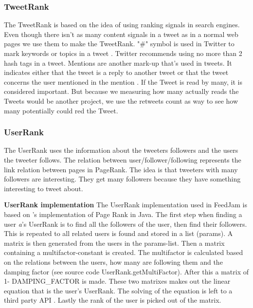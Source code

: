 \subsubsection{TweetRank}
The TweetRank is based on the idea of using ranking signals in search engines. Even though there isn't as many content signals in a tweet as in a normal web pages we use them to make the TweetRank. "\#" symbol is used in Twitter to mark keywords or topics in a tweet \citep{Twitter}. Twitter recommends using no more than 2 hash tags in a tweet. 
Mentions are another mark-up that's used in tweets. It indicates either that the tweet is a reply to another tweet or that the tweet concerns the user mentioned in the mention \citep{Twitterb}.
If the Tweet is read by many, it is considered important. But because we measuring how many actually reads the Tweets would be another project, we use the retweets count as way to see how many potentially could red the Tweet.

\subsubsection{UserRank}
The UserRank uses the information about the tweeters followers and the users the tweeter follows. The relation between user/follower/following represents the link relation between pages in PageRank. The idea is that tweeters with many followers are interesting. They get many followers because they have something interesting to tweet about. 

{\bf UserRank implementation}\newline
The UserRank implementation used in FeedJam is based on \citet{Goodrarzi2009}'s implementation of Page Rank in Java. The first step when finding a user \emph{a}'s UserRank is to find all the followers of the user, then find their followers. This is repeated to all related users is found and stored in a list (params). A matrix is then generated from the users in the params-list. Then a matrix containing a multifactor-constant is created. The multifactor is calculated based on the relations between the users, how many are following them and the damping factor (see source code UserRank.getMultiFactor). After this a matrix of 1- DAMPING\_FACTOR is made. These two matrixes makes out the linear equation that is the user's UserRank. The solving of the equation is left to a third party API \citep{Jama}. Lastly the rank of the user is picked out of the matrix.

